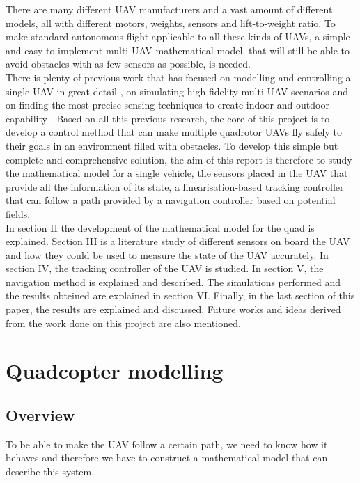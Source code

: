 \documentclass[journal, twoside]{IEEEtran}
\begin{document}
	There are many different UAV manufacturers and a vast amount of different models, all with different motors, weights, sensors and lift-to-weight ratio. To make standard autonomous flight applicable to all these kinds of UAVs, a simple and easy-to-implement multi-UAV mathematical model, that will still be able to avoid obstacles with as few sensors as possible, is needed.\\
	
	 There is plenty of previous work that has focused on modelling and controlling a single UAV in great detail \cite{intro_nolinear_model_control, mod_control_bresciani}, on simulating high-fidelity multi-UAV scenarios \cite{intro_3d_unity} and on finding the most precise sensing techniques to create indoor and outdoor capability \cite{intro_indoor_sensing}. Based on all this previous research, the core of this project is to develop a control method that can make multiple quadrotor UAVs fly safely to their goals in an environment filled with obstacles. To develop this simple but complete and comprehensive solution, the aim of this report is therefore to study the mathematical model for a single vehicle, the sensors placed in the UAV that provide all the information of its state, a linearisation-based tracking controller that can follow a path provided by a navigation controller based on potential fields. \\
	
	In section II the development of the mathematical model for the quad is explained. Section III is a literature study of different sensors on board the UAV and how they could be used to measure the state of the UAV accurately. In section IV, the tracking controller of the UAV is studied. In section V, the navigation method  is explained and described. The simulations performed and the results obteined are explained in section VI. Finally, in the last section of this paper, the results are explained and discussed. Future works and ideas derived from the work done on this project are also mentioned.

	\hfill 	
	
	
	\section{Quadcopter modelling}
	\subsection{Overview}
	To be able to make the UAV follow a certain path, we need to know how it behaves and therefore we have to construct a mathematical model that can describe this system.\\
	
\end{document}
